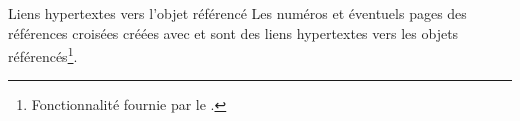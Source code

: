 \documentclass[english,nolocaltoc]{nwejmart}
\newtheorem[style=definition]{fait}
\newtheorem[title=expérience]{experience}
\newtheorem[title-plural=anneaux]{anneau}
\newtheorem[title=idéal,title-plural=idéaux]{ideal}
\begin{document}
\begin{dbremark}{Liens hypertextes vers l'objet référencé}{}
  Les numéros et éventuels  pages des références croisées
  créées avec  et  sont des liens hypertextes vers les
  objets référencés\footnote{Fonctionnalité fournie par le .}.
\end{dbremark}


%
%
\end{document}
